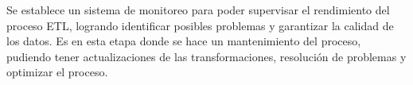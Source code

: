 Se establece un sistema de monitoreo para poder supervisar el rendimiento del proceso ETL, logrando identificar posibles problemas y garantizar la calidad de los datos. Es en esta etapa donde se hace un mantenimiento del proceso, pudiendo tener actualizaciones de las transformaciones, resolución de problemas y optimizar el proceso.